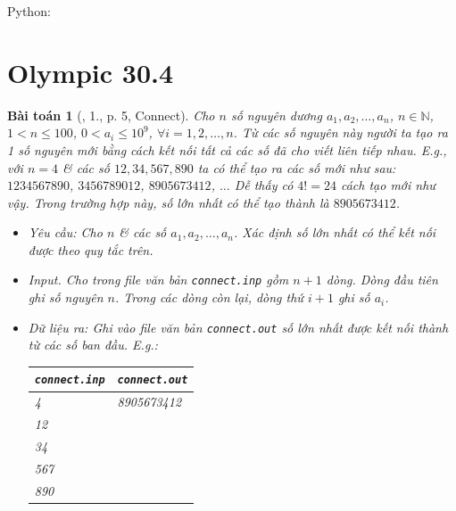 \documentclass{article}
\newtheorem{baitoan}{Bài toán}
\begin{document}
Python:



\section{Olympic 30.4}

\begin{baitoan}[\cite{Olympic30-4_2010_Tin_Hoc}, 1., p. 5, Connect]
	Cho $n$ số nguyên dương $a_1,a_2,\ldots,a_n$, $n\in\mathbb{N}$, $1 < n\le100$, $0 < a_i\le10^9$, $\forall i = 1,2,\ldots,n$. Từ các số nguyên này người ta tạo ra 1 số nguyên mới bằng cách kết nối tất cả các số đã cho viết liên tiếp nhau. E.g., với $n = 4$ \& các số $12,34,567,890$ ta có thể tạo ra các số mới như sau: $1234567890$, $3456789012$, $8905673412$, $\ldots$ Dễ thấy có $4! = 24$ cách tạo mới như vậy. Trong trường hợp này, số lớn nhất có thể tạo thành là $8905673412$.
	\begin{itemize}
		\item {\sf Yêu cầu:} Cho $n$ \& các số $a_1,a_2,\ldots,a_n$. Xác định số lớn nhất có thể kết nối được theo quy tắc trên.
		\item {\sf Input.} Cho trong file văn bản \verb|connect.inp| gồm $n + 1$ dòng. Dòng đầu tiên ghi số nguyên $n$. Trong các dòng còn lại, dòng thứ $i + 1$ ghi số $a_i$.
		\item \emph{Dữ liệu ra:} Ghi vào file văn bản \verb|connect.out| số lớn nhất được kết nối thành từ các số ban đầu. E.g.:
		\begin{table}[H]
			\centering
			\begin{tabular}{|l|l|}
				\hline
				{\tt connect.inp} & {\tt connect.out} \\
				\hline
				4 & 8905673412 \\
				12 &  \\
				34 &  \\
				567 &  \\
				890 &  \\
				\hline
			\end{tabular}
		\end{table}
	\end{itemize}
\end{baitoan}
\end{document}
